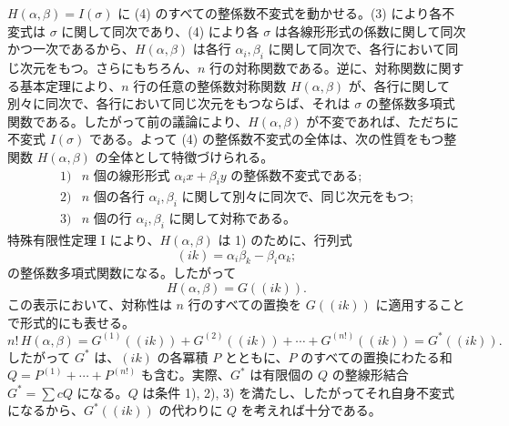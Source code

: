 \documentclass[11pt]{article}
\begin{document}
\(H(\alpha,\beta)=I(\sigma)\) に (4) のすべての整係数不変式を動かせる。(3) により各不変式は \(\sigma\) に関して同次であり、(4) により各 \(\sigma\) は各線形形式の係数に関して同次かつ一次であるから、\(H(\alpha,\beta)\) は各行 \(\alpha_i,\beta_i\) に関して同次で、各行において同じ次元をもつ。さらにもちろん、\(n\) 行の対称関数である。逆に、対称関数に関する基本定理により、\(n\) 行の任意の整係数対称関数 \(H(\alpha,\beta)\) が、各行に関して別々に同次で、各行において同じ次元をもつならば、それは \(\sigma\) の整係数多項式関数である。したがって前の議論により、\(H(\alpha,\beta)\) が不変であれば、ただちに不変式 \(I(\sigma)\) である。よって (4) の整係数不変式の全体は、次の性質をもつ整関数 \(H(\alpha,\beta)\) の全体として特徴づけられる。
\[
\begin{array}{ll}
1) & \text{\(n\) 個の線形形式 \(\alpha_i x+\beta_i y\) の整係数不変式である;}\\
2) & \text{\(n\) 個の各行 \(\alpha_i,\beta_i\) に関して別々に同次で、同じ次元をもつ;}\\
3) & \text{\(n\) 個の行 \(\alpha_i,\beta_i\) に関して対称である。}
\end{array}
\]
特殊有限性定理 I により、\(H(\alpha,\beta)\) は 1) のために、行列式
\[
        (ik)=\alpha_i\beta_k-\beta_i\alpha_k;
\]
の整係数多項式関数になる。したがって
\[
        H(\alpha,\beta)=G((ik)).
\]
この表示において、対称性は \(n\) 行のすべての置換を \(G((ik))\) に適用することで形式的にも表せる。
\begin{equation}
        n!\,H(\alpha,\beta)
        =
        G^{(1)}((ik))+G^{(2)}((ik))+\cdots+G^{(n!)}((ik))
        =G^*((ik)).
\end{equation}
したがって \(G^*\) は、\((ik)\) の各冪積 \(P\) とともに、\(P\) のすべての置換にわたる和 \(Q=P^{(1)}+\cdots+P^{(n!)}\) も含む。実際、\(G^*\) は有限個の \(Q\) の整線形結合 \(G^*=\sum cQ\) になる。\(Q\) は条件 1), 2), 3) を満たし、したがってそれ自身不変式になるから、\(G^*((ik))\) の代わりに \(Q\) を考えれば十分である。
\end{document}
